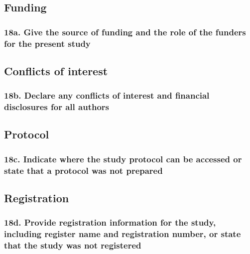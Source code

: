 \documentclass[
  letterpaper,
  DIV=11,
  numbers=noendperiod]{scrartcl}
\begin{document}
\subsection{Funding}\label{funding}

\subsubsection{18a. Give the source of funding and the role of the
funders for the present
study}\label{a.-give-the-source-of-funding-and-the-role-of-the-funders-for-the-present-study}

\subsection{Conflicts of interest}\label{conflicts-of-interest}

\subsubsection{18b. Declare any conflicts of interest and financial
disclosures for all
authors}\label{b.-declare-any-conflicts-of-interest-and-financial-disclosures-for-all-authors}

\subsection{Protocol}\label{protocol}

\subsubsection{18c. Indicate where the study protocol can be accessed or
state that a protocol was not
prepared}\label{c.-indicate-where-the-study-protocol-can-be-accessed-or-state-that-a-protocol-was-not-prepared}

\subsection{Registration}\label{registration}

\subsubsection{18d. Provide registration information for the study,
including register name and registration number, or state that the study
was not
registered}\label{d.-provide-registration-information-for-the-study-including-register-name-and-registration-number-or-state-that-the-study-was-not-registered}
\end{document}
